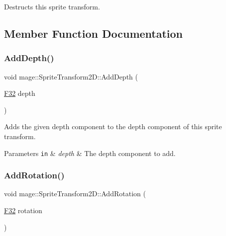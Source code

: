 Destructs this sprite transform. 

\subsection{Member Function Documentation}
\mbox{\label{classmage_1_1_sprite_transform2_d_a38fd747ee38135b827971002a85e4f9f}} 
\subsubsection{\texorpdfstring{Add\+Depth()}{AddDepth()}}
{\footnotesize\ttfamily void mage\+::\+Sprite\+Transform2\+D\+::\+Add\+Depth (\begin{DoxyParamCaption}\item[{\mbox{\hyperlink{namespacemage_aa97e833b45f06d60a0a9c4fc22ae02c0}{F32}}}]{depth }\end{DoxyParamCaption})\hspace{0.3cm}{\ttfamily [noexcept]}}

Adds the given depth component to the depth component of this sprite transform.


\begin{DoxyParams}[1]{Parameters}
\mbox{\tt in}  & {\em depth} & The depth component to add. \\
\hline
\end{DoxyParams}
\mbox{\label{classmage_1_1_sprite_transform2_d_ab7c282aedb9bf158d82175f0cab0180e}} 
\subsubsection{\texorpdfstring{Add\+Rotation()}{AddRotation()}\hspace{0.1cm}{\footnotesize\ttfamily [1/2]}}
{\footnotesize\ttfamily void mage\+::\+Sprite\+Transform2\+D\+::\+Add\+Rotation (\begin{DoxyParamCaption}\item[{\mbox{\hyperlink{namespacemage_aa97e833b45f06d60a0a9c4fc22ae02c0}{F32}}}]{rotation }\end{DoxyParamCaption})\hspace{0.3cm}{\ttfamily [noexcept]}}

